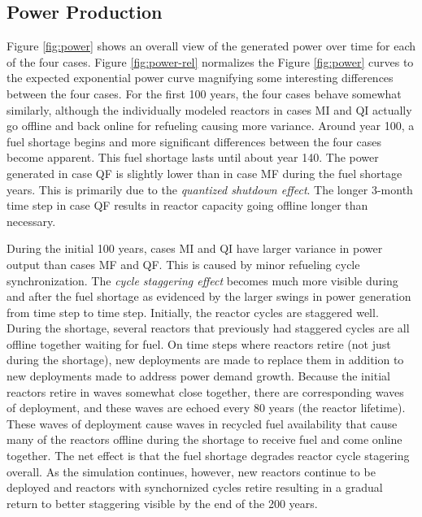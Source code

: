 \documentclass{style}
\begin{document}
\subsection{Power Production}

Figure \ref{fig:power} shows an overall view of the generated power over time
for each of the four cases.  Figure \ref{fig:power-rel} normalizes the Figure
\ref{fig:power} curves to the expected exponential power curve magnifying some
interesting differences between the four cases.  For the first 100 years, the
four cases behave somewhat similarly, although the individually modeled
reactors in cases MI and QI actually go offline and back online for refueling
causing more variance.  Around year 100, a fuel shortage begins and more
significant differences between the four cases become apparent. This fuel
shortage lasts until about year 140. The power generated in case QF is slightly
lower than in case MF during the fuel shortage years. This is primarily due to
the \emph{quantized shutdown effect}.  The longer 3-month time step in case QF 
results in reactor capacity going offline longer than necessary.

During the initial 100 years, cases MI and QI have larger variance in power
output than cases MF and QF.  This is caused by minor refueling cycle
synchronization.  The \emph{cycle staggering effect} becomes much more visible
during and after the fuel shortage as evidenced by the larger swings in power
generation from time step to time step.  Initially, the reactor cycles are
staggered well.  During the shortage, several reactors that previously had
staggered cycles are all offline together waiting for fuel.  On time steps
where reactors retire (not just during the shortage), new deployments are made
to replace them in addition to new deployments made to address power demand
growth.  Because the initial reactors retire in waves somewhat close together,
there are corresponding waves of deployment, and these waves are echoed every
80 years (the reactor lifetime).  These waves of deployment cause waves in
recycled fuel availability that cause many of the reactors offline during the
shortage to receive fuel and come online together.  The net effect is that the
fuel shortage degrades reactor cycle stagering overall.  As the simulation
continues, however, new reactors continue to be deployed and reactors with
synchornized cycles retire resulting in a gradual return to better
staggering visible by the end of the 200 years.
\end{document}
